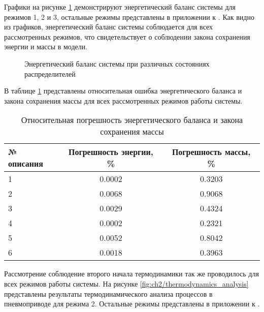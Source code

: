 Графики на рисунке \ref{fig:ch2/energy_balance} демонстрируют энергетический баланс системы для режимов 1, 2 и 3, остальные
режимы представлены в приложении к . Как видно из графиков, энергетический баланс системы соблюдается
для всех рассмотренных режимов, что свидетельствует о соблюдении закона сохранения энергии и массы в модели.

\begin{figure}[ht]
    \caption{Энергетический баланс системы при различных состояниях распределителей}
    \label{fig:ch2/energy_balance}

\end{figure}

В таблице \ref{tab:ch2/energy_balance} представлены относительная ошибка
энергетического баланса и закона сохранения массы
для всех рассмотренных режимов работы системы.

\begin{table}[h]
    \centering
    \caption{Относительная погрешность энергетического баланса и закона сохранения массы}
    \begin{tabular}{l|c|c}
        \midrule
        № описания & Погрешность энергии, \% & Погрешность массы, \% \\
        \midrule
        1          & 0.0002                  & 0.3203                \\
        \hline
        2          & 0.0068                  & 0.9068                \\
        \hline
        3          & 0.0029                  & 0.4324                \\
        \hline
        4          & 0.0002                  & 0.2321                \\
        \hline
        5          & 0.0052                  & 0.8042                \\
        \hline
        6          & 0.0018                  & 0.3963                \\
        \midrule
    \end{tabular}
    \label{tab:ch2/energy_balance}
\end{table}

Рассмотрение соблюдение второго начала термодинамики так же проводилось для всех режимов работы системы. На рисунке
\ref{fig:ch2/thermodynamics_analysis} представлены результаты термодинамического анализа процессов в пневмоприводе 
для режима 2. Остальные режимы представлены в приложении к .

